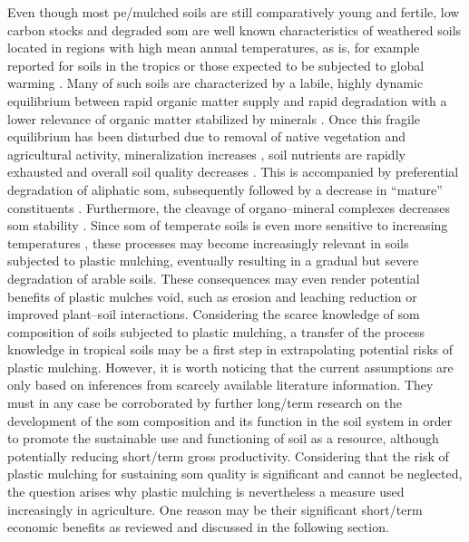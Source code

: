 Even though most \ac{pe}\-/mulched soils are still comparatively young and fertile, low carbon stocks and degraded \ac{som} are well known characteristics of weathered soils located in regions with high mean annual temperatures, as is, for example reported for soils in the tropics or those expected to be subjected to global warming \citep{DavidsonTemperature2006}. Many of such soils are characterized by a labile, highly dynamic equilibrium between rapid organic matter supply and rapid degradation with a lower relevance of organic matter stabilized by minerals \citep{ZechFactors1997}. Once this fragile equilibrium has been disturbed due to removal of native vegetation and agricultural activity, mineralization increases \citep{RichardsSoil2007}, soil nutrients are rapidly exhausted and overall soil quality decreases \citep{vanStraatenConversion2015}. This is accompanied by preferential degradation of aliphatic \ac{som}, subsequently followed by a decrease in ``mature'' constituents \citep{PardoCultivationInduced2012}. Furthermore, the cleavage of organo--mineral complexes decreases \ac{som} stability \citep{ShangOrganic1997}. Since \ac{som} of temperate soils is even more sensitive to increasing temperatures \citep{GrisiTemperature1998}, these processes may become increasingly relevant in soils subjected to plastic mulching, eventually resulting in a gradual but severe degradation of arable soils. These consequences may even render potential benefits of plastic mulches void, such as erosion and leaching reduction or improved plant--soil interactions. Considering the scarce knowledge of \ac{som} composition of soils subjected to plastic mulching, a transfer of the process knowledge in tropical soils may be a first step in extrapolating potential risks of plastic mulching. However, it is worth noticing that the current assumptions are only based on inferences from scarcely available literature information. They must in any case be corroborated by further long\-/term research on the development of the \ac{som} composition and its function in the soil system in order to promote the sustainable use and functioning of soil as a resource, although potentially reducing short\-/term gross productivity. Considering that the risk of plastic mulching for sustaining \ac{som} quality is significant and cannot be neglected, the question arises why plastic mulching is nevertheless a measure used increasingly in agriculture. One reason may be their significant short\-/term economic benefits as reviewed and discussed in the following section.

